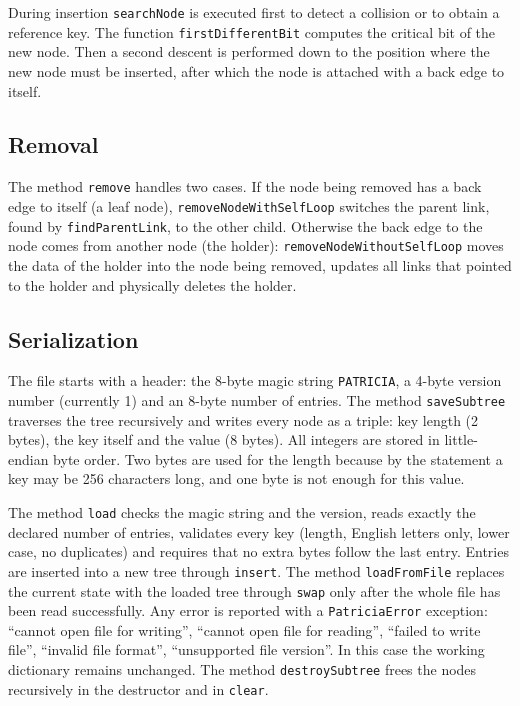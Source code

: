 During insertion \texttt{searchNode} is executed first to detect a collision or to obtain a
reference key. The function \texttt{firstDifferentBit} computes the critical bit of the new node.
Then a second descent is performed down to the position where the new node must be inserted,
after which the node is attached with a back edge to itself.

\subsection{Removal}

The method \texttt{remove} handles two cases. If the node being removed has a back edge to itself
(a leaf node), \texttt{removeNodeWithSelfLoop} switches the parent link, found by
\texttt{findParentLink}, to the other child. Otherwise the back edge to the node comes from another
node (the holder): \texttt{removeNodeWithoutSelfLoop} moves the data of the holder into the node
being removed, updates all links that pointed to the holder and physically deletes the holder.

\subsection{Serialization}

The file starts with a header: the 8-byte magic string \texttt{PATRICIA}, a 4-byte version number
(currently 1) and an 8-byte number of entries. The method \texttt{saveSubtree} traverses the tree
recursively and writes every node as a triple: key length (2 bytes), the key itself and the value
(8 bytes). All integers are stored in little-endian byte order. Two bytes are used for the length
because by the statement a key may be 256 characters long, and one byte is not enough for this
value.

The method \texttt{load} checks the magic string and the version, reads exactly the declared number
of entries, validates every key (length, English letters only, lower case, no duplicates) and
requires that no extra bytes follow the last entry. Entries are inserted into a new tree through
\texttt{insert}. The method \texttt{loadFromFile} replaces the current state with the loaded tree
through \texttt{swap} only after the whole file has been read successfully. Any error is reported
with a \texttt{PatriciaError} exception: \enquote{cannot open file for writing}, \enquote{cannot
open file for reading}, \enquote{failed to write file}, \enquote{invalid file format},
\enquote{unsupported file version}. In this case the working dictionary remains unchanged. The
method \texttt{destroySubtree} frees the nodes recursively in the destructor and in
\texttt{clear}.

